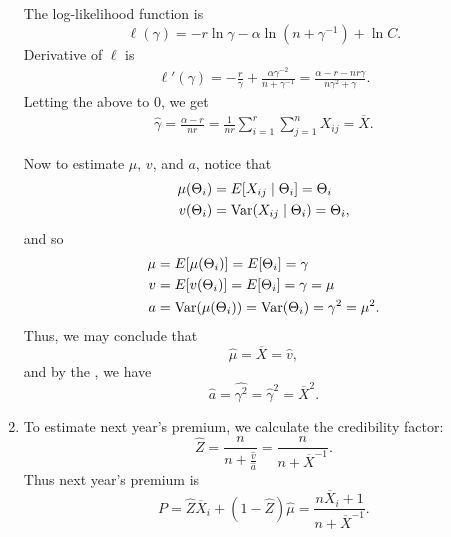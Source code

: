 \documentclass[notoc,notitlepage]{tufte-book}
\begin{document}
\begin{solution}
\begin{enumerate}
      The log-likelihood function is
      \begin{equation*}
        \ell(\gamma) = - r \ln \gamma - \alpha \ln (n + \gamma^{-1}) + \ln C.
      \end{equation*}
      Derivative of $\ell$ is
      \begin{align*}
        \ell'(\gamma)
        = -\frac{r}{\gamma} + \frac{\alpha \gamma^{-2}}{n + \gamma^{-1}}
        = \frac{\alpha - r - nr\gamma}{n\gamma^2 + \gamma}.
      \end{align*}
      Letting the above to $0$, we get
      \begin{align*}
        \hat{\gamma} = \frac{\alpha - r}{nr}
        = \frac{1}{nr} \sum_{i=1}^{r} \sum_{j=1}^{n} X_{ij} = \overline{X}.
      \end{align*}

      Now to estimate $\mu,\, v$, and $a$, notice that
      \begin{align*}
        \mu(\Theta_i) &= E[X_{ij} \mid \Theta_i] = \Theta_i \\
        v(\Theta_i) &= \operatorname{Var}(X_{ij} \mid \Theta_i) = \Theta_i,
      \end{align*}
      and so
      \begin{align*}
        \mu &= E[\mu(\Theta_i)] = E[\Theta_i] = \gamma \\
        v &= E[v(\Theta_i)] = E[\Theta_i] = \gamma = \mu \\
        a &= \operatorname{Var}(\mu(\Theta_i)) = \operatorname{Var}(\Theta_i) = \gamma^2 = \mu^2.
      \end{align*}
      Thus, we may conclude that
      \begin{equation*}
        \hat{\mu} = \overline{X} = \hat{v},
      \end{equation*}
      and by the , we have
      \begin{equation*}
        \hat{a} = \hat{\gamma^2} = \hat{\gamma}^2 = \overline{X}^2.
      \end{equation*}

    \item To estimate next year's premium, we calculate the credibility factor:
      \begin{equation*}
        \hat{Z} = \frac{n}{n + \frac{\hat{v}}{\hat{a}}}
              = \frac{n}{n + \overline{X}^{-1}}.
      \end{equation*}
      Thus next year's premium is
      \begin{equation*}
        P = \hat{Z} \overline{X}_i + (1 - \hat{Z})\hat{\mu}
          = \frac{n\overline{X}_i + 1}{n + \overline{X}^{-1}}.
      \end{equation*}
  \end{enumerate}
\end{solution}
\end{document}
